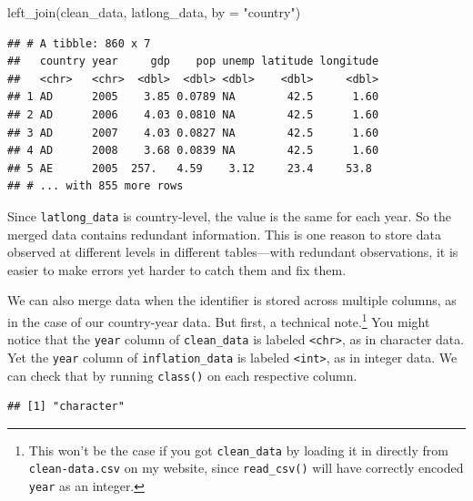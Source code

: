 \documentclass[
  12pt,
  oneside,openany]{book}
\newenvironment{Shaded}{\begin{snugshade}}{\end{snugshade}}
\newcommand{\AttributeTok}[1]{\textcolor[rgb]{0.77,0.63,0.00}{#1}}
\newcommand{\FunctionTok}[1]{\textcolor[rgb]{0.00,0.00,0.00}{#1}}
\newcommand{\NormalTok}[1]{#1}
\newcommand{\SpecialCharTok}[1]{\textcolor[rgb]{0.00,0.00,0.00}{#1}}
\newcommand{\StringTok}[1]{\textcolor[rgb]{0.31,0.60,0.02}{#1}}
\begin{document}
\begin{Shaded}
\begin{Highlighting}[]
\FunctionTok{left\_join}\NormalTok{(clean\_data,}
\NormalTok{          latlong\_data,}
          \AttributeTok{by =} \StringTok{"country"}\NormalTok{)}
\end{Highlighting}
\end{Shaded}

\begin{verbatim}
## # A tibble: 860 x 7
##   country year     gdp    pop unemp latitude longitude
##   <chr>   <chr>  <dbl>  <dbl> <dbl>    <dbl>     <dbl>
## 1 AD      2005    3.85 0.0789 NA        42.5      1.60
## 2 AD      2006    4.03 0.0810 NA        42.5      1.60
## 3 AD      2007    4.03 0.0827 NA        42.5      1.60
## 4 AD      2008    3.68 0.0839 NA        42.5      1.60
## 5 AE      2005  257.   4.59    3.12     23.4     53.8 
## # ... with 855 more rows
\end{verbatim}

Since \texttt{latlong\_data} is country-level, the value is the same for each year. So the merged data contains redundant information. This is one reason to store data observed at different levels in different tables---with redundant observations, it is easier to make errors yet harder to catch them and fix them.

We can also merge data when the identifier is stored across multiple columns, as in the case of our country-year data. But first, a technical note.\footnote{This won't be the case if you got \texttt{clean\_data} by loading it in directly from \texttt{clean-data.csv} on my website, since \texttt{read\_csv()} will have correctly encoded \texttt{year} as an integer.} You might notice that the \texttt{year} column of \texttt{clean\_data} is labeled \texttt{\textless{}chr\textgreater{}}, as in character data. Yet the \texttt{year} column of \texttt{inflation\_data} is labeled \texttt{\textless{}int\textgreater{}}, as in integer data. We can check that by running \texttt{class()} on each respective column.

\begin{Shaded}
\end{Shaded}

\begin{verbatim}
## [1] "character"
\end{verbatim}
\end{document}
